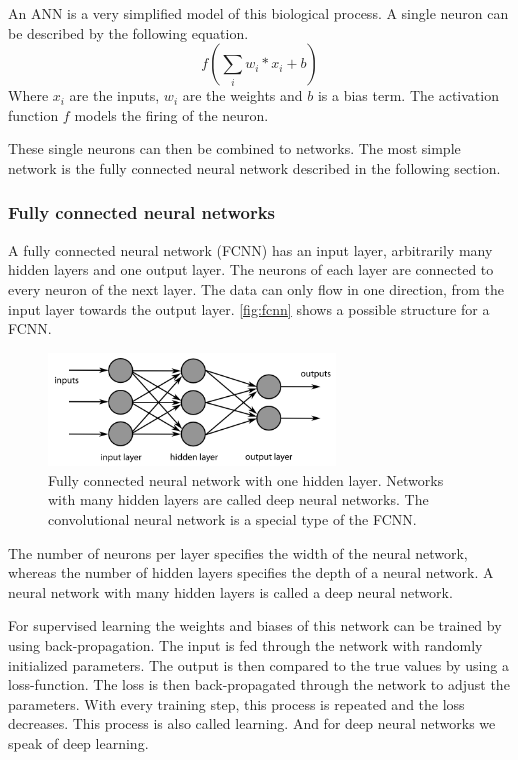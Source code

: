 \documentclass[12pt]{article}
\begin{document}
An ANN is a very simplified model of this biological process. A single neuron can be described by the following equation. $$f\left(\sum_{i}w_i*x_i+b\right)$$ Where $x_i$ are the inputs, $w_i$ are the weights and $b$ is a bias term. The activation function $f$ models the firing of the neuron.

These single neurons can then be combined to networks. The most simple network is the fully connected neural network described in the following section.

\subsubsection{Fully connected neural networks}
\label{subsubsec:fcnn}
A fully connected neural network (FCNN) has an input layer, arbitrarily many hidden layers and one output layer. The neurons of each layer are connected to every neuron of the next layer. The data  can only flow in one direction, from the input layer towards the output layer. \autoref{fig:fcnn} shows a possible structure for a FCNN.

\begin{figure}[ht]
\includegraphics[width=3in]{ffnn}	
\caption{Fully connected neural network with one hidden layer. Networks with many hidden layers are called deep neural networks. The convolutional neural network is a special type of the FCNN.}
\label{fig:fcnn}
\end{figure}

The number of neurons per layer specifies the width of the neural network, whereas the number of hidden layers specifies the depth of a neural network. A neural network with many hidden layers is called a deep neural network.

For supervised learning the weights and biases of this network can be trained by using back-propagation. The input is fed through the network with randomly initialized parameters. The output is then compared to the true values by using a loss-function. The loss is then back-propagated through the network to adjust the parameters. With every training step, this process is repeated and the loss decreases. This process is also called learning. And for deep neural networks we speak of deep learning.
\end{document}
